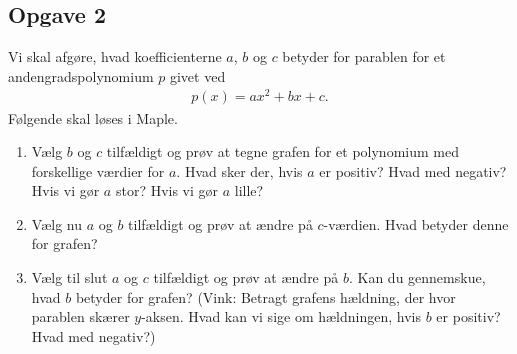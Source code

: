 \subsection*{Opgave 2}
Vi skal afgøre, hvad koefficienterne $a$, $b$ og $c$ betyder for parablen for et andengradspolynomium $p$ givet ved
\begin{align*}
	p(x) = ax^2 + bx + c.
\end{align*}
Følgende skal løses i Maple. 
\begin{enumerate}[label=\roman*)]
	\item Vælg $b$ og $c$ tilfældigt og prøv at tegne grafen for et polynomium med forskellige værdier for $a$. 
	Hvad sker der, hvis $a$ er positiv? Hvad med negativ? Hvis vi gør $a$ stor? Hvis vi gør $a$ lille?
	\item Vælg nu $a$ og $b$ tilfældigt og prøv at ændre på $c$-værdien. Hvad betyder denne for grafen?
	\item Vælg til slut $a$ og $c$ tilfældigt og prøv at ændre på $b$. Kan du gennemskue, hvad $b$ betyder for
	grafen? (Vink: Betragt grafens hældning, der hvor parablen skærer $y$-aksen. Hvad kan vi sige om 
	hældningen, hvis $b$ er positiv? Hvad med negativ?)
\end{enumerate}


